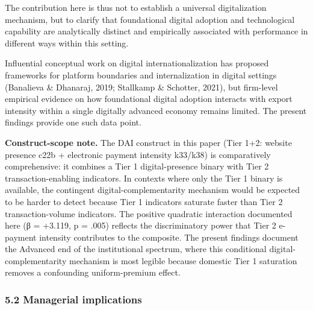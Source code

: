 \documentclass[12pt,a4paper]{article}
\begin{document}
The contribution here is thus not to establish a universal
digitalization mechanism, but to clarify that foundational digital
adoption and technological capability are analytically distinct and
empirically associated with performance in different ways within this
setting.

Influential conceptual work on digital internationalization has proposed
frameworks for platform boundaries and internalization in digital
settings (Banalieva \& Dhanaraj, 2019; Stallkamp \& Schotter, 2021), but
firm-level empirical evidence on how foundational digital adoption
interacts with export intensity within a single digitally advanced
economy remains limited. The present findings provide one such data
point.

\textbf{Construct-scope note.} The DAI construct in this paper (Tier
1+2: website presence c22b + electronic payment intensity k33/k38) is
comparatively comprehensive: it combines a Tier 1 digital-presence
binary with Tier 2 transaction-enabling indicators. In contexts where
only the Tier 1 binary is available, the contingent
digital-complementarity mechanism would be expected to be harder to
detect because Tier 1 indicators saturate faster than Tier 2
transaction-volume indicators. The positive quadratic interaction
documented here (β = +3.119, p = .005) reflects the discriminatory power
that Tier 2 e-payment intensity contributes to the composite. The
present findings document the Advanced end of the institutional
spectrum, where this conditional digital-complementarity mechanism is
most legible because domestic Tier 1 saturation removes a confounding
uniform-premium effect.

\hypertarget{52-managerial-implications}{%
\subsubsection{5.2 Managerial
implications}\label{52-managerial-implications}}
\end{document}
